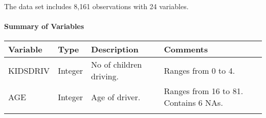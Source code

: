 \documentclass[]{article}
\let\oldparagraph\paragraph
\renewcommand{\paragraph}[1]{\oldparagraph{#1}\mbox{}}
\begin{document}
The data set includes 8,161 observations with 24 variables.

\paragraph{Summary of Variables}\label{summary-of-variables}

\begin{longtable}[]{@{}llll@{}}
\toprule
\begin{minipage}[b]{0.16\columnwidth}\raggedright\strut
Variable\strut
\end{minipage} & \begin{minipage}[b]{0.12\columnwidth}\raggedright\strut
Type\strut
\end{minipage} & \begin{minipage}[b]{0.28\columnwidth}\raggedright\strut
Description\strut
\end{minipage} & \begin{minipage}[b]{0.28\columnwidth}\raggedright\strut
Comments\strut
\end{minipage}\tabularnewline
\midrule
\endhead
\begin{minipage}[t]{0.16\columnwidth}\raggedright\strut
KIDSDRIV\strut
\end{minipage} & \begin{minipage}[t]{0.12\columnwidth}\raggedright\strut
Integer\strut
\end{minipage} & \begin{minipage}[t]{0.28\columnwidth}\raggedright\strut
No of children driving.\strut
\end{minipage} & \begin{minipage}[t]{0.28\columnwidth}\raggedright\strut
Ranges from 0 to 4.\strut
\end{minipage}\tabularnewline
\begin{minipage}[t]{0.16\columnwidth}\raggedright\strut
AGE\strut
\end{minipage} & \begin{minipage}[t]{0.12\columnwidth}\raggedright\strut
Integer\strut
\end{minipage} & \begin{minipage}[t]{0.28\columnwidth}\raggedright\strut
Age of driver.\strut
\end{minipage} & \begin{minipage}[t]{0.28\columnwidth}\raggedright\strut
Ranges from 16 to 81. Contains 6 NAs.\strut
\end{minipage}\tabularnewline
\begin{minipage}[t]{0.16\columnwidth}\raggedright\strut

\end{minipage}
\end{longtable}
\end{document}
